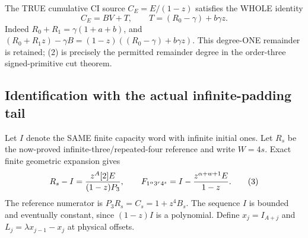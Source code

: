 The TRUE cumulative CI source $C_E=E/(1-z)$ satisfies the WHOLE identity
\[
 C_E=BV+T,\qquad T=(R_0-\gamma)+b\gamma z.                 \tag{2}
\]
Indeed $R_0+R_1=\gamma(1+a+b)$, and
$(R_0+R_1z)-\gamma B=(1-z)((R_0-\gamma)+b\gamma z)$.
This degree-ONE remainder is retained; (2) is precisely the permitted
remainder degree in the order-three signed-primitive cut theorem.

\subsection{Identification with the actual infinite-padding tail}
Let $I$ denote the SAME finite capacity word with infinite initial
ones. Let $R_s$ be the now-proved infinite-three/repeated-four reference
and write $W=4s$. Exact finite geometric expansion gives
\[
 R_s-I={z^A[2]E\over(1-z)P_3},\qquad
 F_{1^\alpha3^r4^s}=I-{z^{\alpha+w+1}E\over1-z}.          \tag{3}
\]
The reference numerator is $P_3R_s=C_s=1+z^4B_s$.
The sequence $I$ is bounded and eventually constant, since $(1-z)I$
is a polynomial. Define $x_j=I_{A+j}$ and
$L_j=\lambda x_{j-1}-x_j$ at physical offsets.

